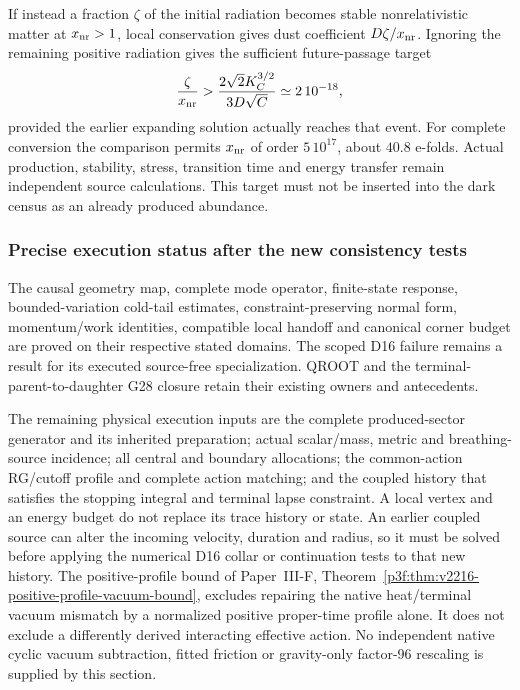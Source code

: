 \documentclass[12pt,a4paper]{article}
\begin{document}
If instead a fraction $\zeta$ of the initial radiation becomes stable
nonrelativistic matter at $x_{\rm nr}>1$, local conservation gives dust
coefficient $D\zeta/x_{\rm nr}$.  Ignoring the remaining positive
radiation gives the sufficient future-passage target
\[
 \frac\zeta{x_{\rm nr}}>
 \frac{2\sqrt2K_C^{3/2}}{3D\sqrt C}\simeq2\,10^{-18},
\]
provided the earlier expanding solution actually reaches that event.
For complete conversion the comparison permits $x_{\rm nr}$ of order
$5\,10^{17}$, about $40.8$ e-folds.  Actual production, stability,
stress, transition time and energy transfer remain independent source
calculations.  This target must not be inserted into the dark census as
an already produced abundance.

\subsubsection{Precise execution status after the new consistency tests}
\label{p8:sec:v2216-closure-status}
The causal geometry map, complete mode operator, finite-state response,
bounded-variation cold-tail estimates, constraint-preserving normal form,
momentum/work identities, compatible local handoff and canonical corner
budget are proved on their respective stated domains.  The scoped D16
failure remains a result for its executed source-free specialization.
QROOT and the terminal-parent-to-daughter G28 closure retain their
existing owners and antecedents.

The remaining physical execution inputs are the complete produced-sector
generator and its inherited preparation; actual scalar/mass, metric and
breathing-source incidence; all central and boundary allocations; the
common-action RG/cutoff profile and complete action matching; and the
coupled history that satisfies the stopping integral and terminal lapse
constraint.  A local vertex and an energy budget do not replace its
trace history or state.  An earlier coupled source can alter the incoming
velocity, duration and radius, so it must be solved before applying the
numerical D16 collar or continuation tests to that new history.
The positive-profile bound of Paper~III-F,
Theorem~\ref{p3f:thm:v2216-positive-profile-vacuum-bound}, excludes
repairing the native heat/terminal vacuum mismatch by a normalized
positive proper-time profile alone.  It does not exclude a differently
derived interacting effective action.  No independent native cyclic
vacuum subtraction, fitted friction or gravity-only factor-96 rescaling
is supplied by this section.
\end{document}
